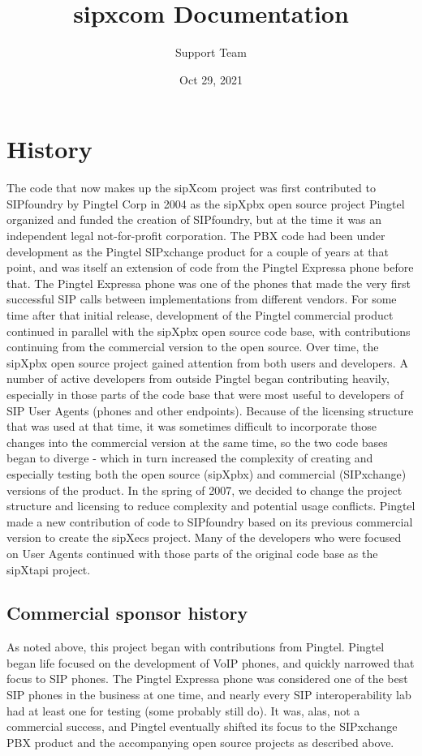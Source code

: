 \documentclass[letterpaper,10pt,english]{sphinxmanual}
\title{sipxcom Documentation}
\date{Oct 29, 2021}
\author{Support Team}
\begin{document}
\pagestyle{empty}
\sphinxmaketitle
\pagestyle{plain}
\sphinxtableofcontents
\pagestyle{normal}
\label{\detokenize{index::doc}}
\ignorespaces 


\ignorespaces 

\chapter{History}
\label{\detokenize{history:history}}\label{\detokenize{history:index-0}}\label{\detokenize{history::doc}}
The code that now makes up the sipXcom project was first contributed to SIPfoundry by Pingtel Corp in 2004 as the sipXpbx open source project Pingtel organized and funded the creation of SIPfoundry, but at the time it was an independent legal not-for-profit corporation. The PBX code had been under development as the Pingtel SIPxchange product for a couple of years at that point, and was itself an extension of code from the Pingtel Expressa phone before that. The Pingtel Expressa phone was one of the phones that made the very first successful SIP calls between implementations from different vendors. For some time after that initial release, development of the Pingtel commercial product continued in parallel with the sipXpbx open source code base, with contributions continuing from the commercial version to the open source. Over time, the sipXpbx open source project gained attention from both users and developers. A number of active developers from outside Pingtel began contributing heavily, especially in those parts of the code base that were most useful to developers of SIP User Agents (phones and other endpoints). Because of the licensing structure that was used at that time, it was sometimes difficult to incorporate those changes into the commercial version at the same time, so the two code bases began to diverge - which in turn increased the complexity of creating and especially testing both the open source (sipXpbx) and commercial (SIPxchange) versions of the product. In the spring of 2007, we decided to change the project structure and licensing to reduce complexity and potential usage conflicts. Pingtel made a new contribution of code to SIPfoundry based on its previous commercial version to create the sipXecs project. Many of the developers who were focused on User Agents continued with those parts of the original code base as the sipXtapi project.


\section{Commercial sponsor history}
\label{\detokenize{history:commercial-sponsor-history}}
As noted above, this project began with contributions from Pingtel. Pingtel began life focused on the development of VoIP phones, and quickly narrowed that focus to SIP phones. The Pingtel Expressa phone was considered one of the best SIP phones in the business at one time, and nearly every SIP interoperability lab had at least one for testing (some probably still do). It was, alas, not a commercial success, and Pingtel eventually shifted its focus to the SIPxchange PBX product and the accompanying open source projects as described above.
\end{document}
